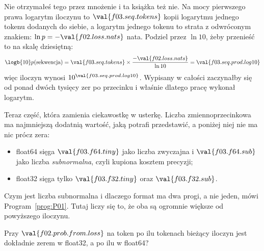 \begin{fr}
Nie otrzymałeś tego przez mnożenie i ta książka też nie. Na mocy pierwszego
prawa logarytm iloczynu to $\val{f03.seq.tokens}$ kopii logarytmu jednego
tokenu dodanych do siebie, a logarytm jednego tokenu to strata z odwróconym
znakiem: $\ln p = -\val{f02.loss.nats}$ nata. Podziel przez $\ln 10$, żeby
przenieść to na skalę dziesiętną:
\[ \logb{10} p(\text{sekwencja})
   = \val{f03.seq.tokens} \times \frac{-\val{f02.loss.nats}}{\ln 10}
   = \val{f03.seq.prod.log10} \]
więc iloczyn wynosi $10^{\val{f03.seq.prod.log10}}$. Wypisany w całości
zaczynałby się od ponad dwóch tysięcy zer po przecinku i właśnie dlatego pracę
wykonał logarytm.

Teraz część, która zamienia ciekawostkę w usterkę. Liczba
zmiennoprzecinkowa ma najmniejszą dodatnią wartość, jaką potrafi
przedstawić, a poniżej niej nie ma nic prócz zera:

\begin{itemize}
\item float64 sięga $\val{f03.f64.tiny}$ jako liczba zwyczajna i
  $\val{f03.f64.sub}$ jako liczba \emph{subnormalna}, czyli kupiona kosztem
  precyzji;
\item float32 sięga tylko $\val{f03.f32.tiny}$ oraz $\val{f03.f32.sub}$.
\end{itemize}

Czym jest liczba subnormalna i dlaczego format ma dwa progi, a nie jeden, mówi
Program~\ref{prog:P01}. Tutaj liczy się to, że oba są ogromnie większe od
powyższego iloczynu.

Przy $\val{f02.prob.from.loss}$ na token \dash{} po ilu tokenach bieżący
iloczyn jest dokładnie zerem w float32, a po ilu w float64?
\nextframe
\end{fr}

